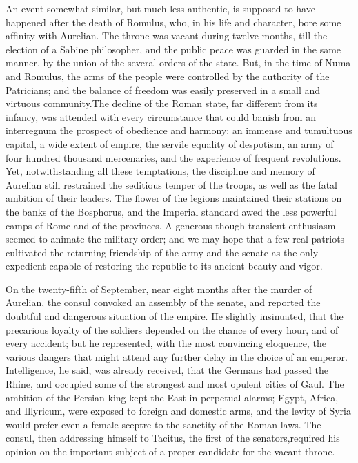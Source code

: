 An event somewhat similar, but much less authentic, is supposed
to have happened after the death of Romulus, who, in his life and
character, bore some affinity with Aurelian. The throne was
vacant during twelve months, till the election of a Sabine
philosopher, and the public peace was guarded in the same manner,
by the union of the several orders of the state. But, in the time
of Numa and Romulus, the arms of the people were controlled by
the authority of the Patricians; and the balance of freedom was
easily preserved in a small and virtuous community.\footnotemark[3] The decline
of the Roman state, far different from its infancy, was attended
with every circumstance that could banish from an interregnum the
prospect of obedience and harmony: an immense and tumultuous
capital, a wide extent of empire, the servile equality of
despotism, an army of four hundred thousand mercenaries, and the
experience of frequent revolutions. Yet, notwithstanding all
these temptations, the discipline and memory of Aurelian still
restrained the seditious temper of the troops, as well as the
fatal ambition of their leaders. The flower of the legions
maintained their stations on the banks of the Bosphorus, and the
Imperial standard awed the less powerful camps of Rome and of the
provinces. A generous though transient enthusiasm seemed to
animate the military order; and we may hope that a few real
patriots cultivated the returning friendship of the army and the
senate as the only expedient capable of restoring the republic to
its ancient beauty and vigor.


On the twenty-fifth of September, near eight months after the
murder of Aurelian, the consul convoked an assembly of the
senate, and reported the doubtful and dangerous situation of the
empire. He slightly insinuated, that the precarious loyalty of
the soldiers depended on the chance of every hour, and of every
accident; but he represented, with the most convincing eloquence,
the various dangers that might attend any further delay in the
choice of an emperor. Intelligence, he said, was already
received, that the Germans had passed the Rhine, and occupied
some of the strongest and most opulent cities of Gaul. The
ambition of the Persian king kept the East in perpetual alarms;
Egypt, Africa, and Illyricum, were exposed to foreign and
domestic arms, and the levity of Syria would prefer even a female
sceptre to the sanctity of the Roman laws. The consul, then
addressing himself to Tacitus, the first of the senators,\footnotemark[4]
required his opinion on the important subject of a proper
candidate for the vacant throne.


